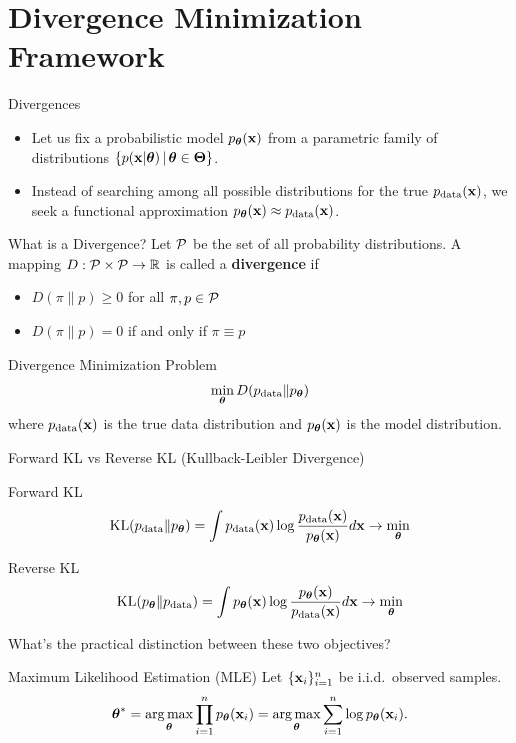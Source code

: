 \documentclass{beamer}
\renewcommand{\eqpause}{}
\begin{document}
\section{Divergence Minimization Framework}
\begin{frame}{Divergences}
	\begin{itemize}
	\item Let us fix a probabilistic model $p_{\boldsymbol{\theta}}(\mathbf{x})$ from a parametric family of distributions $\{p(\mathbf{x} | \boldsymbol{\theta}) \, | \, \boldsymbol{\theta} \in \boldsymbol{\Theta}\}$.\\
        \eqpause
	\item Instead of searching among all possible distributions for the true $p_{\text{data}}(\mathbf{x})$, we seek a functional approximation $p_{\boldsymbol{\theta}}(\mathbf{x}) \approx p_{\text{data}}(\mathbf{x})$.
	\end{itemize}
    \eqpause
	\begin{block}{What is a Divergence?}
		Let $\mathcal{P}$ be the set of all probability distributions. A mapping $D: \mathcal{P} \times \mathcal{P} \to \mathbb{R}$ is called a \textbf{divergence} if 
		\begin{itemize}
			\item $D(\pi \| p) \geq 0$ for all $\pi, p \in \mathcal{P}$
			\item $D(\pi \| p) = 0$ if and only if $\pi \equiv p$
		\end{itemize}
	\end{block}
    \eqpause
	\begin{block}{Divergence Minimization Problem}
		\vspace{-0.3cm}
		$$
		\min_{\boldsymbol{\theta}} D(p_{\text{data}} \| p_{\boldsymbol{\theta}})
		$$
		where $p_{\text{data}}(\mathbf{x})$ is the true data distribution and $p_{\boldsymbol{\theta}}(\mathbf{x})$ is the model distribution.
	\end{block}
\end{frame}
\begin{frame}{Forward KL vs Reverse KL (Kullback-Leibler Divergence)}
	\begin{block}{Forward KL}
		\vspace{-0.2cm}
		\[
			\mathrm{KL}(p_{\text{data}} \| p_{\boldsymbol{\theta}}) = \int p_{\text{data}}(\mathbf{x}) \log \frac{p_{\text{data}}(\mathbf{x})}{p_{\boldsymbol{\theta}}(\mathbf{x})} d \mathbf{x} \rightarrow \min_{\boldsymbol{\theta}}
		\]
	\end{block}
    \eqpause
	\begin{block}{Reverse KL}
		\vspace{-0.2cm}
		\[
			\mathrm{KL}(p_{\boldsymbol{\theta}} \| p_{\text{data}}) = \int p_{\boldsymbol{\theta}}(\mathbf{x}) \log \frac{p_{\boldsymbol{\theta}}(\mathbf{x})}{p_{\text{data}}(\mathbf{x})} d \mathbf{x} \rightarrow \min_{\boldsymbol{\theta}}
		\]
	\end{block}
    \eqpause
	What's the practical distinction between these two objectives?
    \eqpause
	\begin{block}{Maximum Likelihood Estimation (MLE)}
	Let $\{\mathbf{x}_i\}_{i=1}^n$ be i.i.d.\ observed samples.
		\vspace{-0.3cm}
		\[
			\boldsymbol{\theta}^* = \operatorname*{arg\,max}_{\boldsymbol{\theta}} \prod_{i=1}^n p_{\boldsymbol{\theta}}(\mathbf{x}_i) = \operatorname*{arg\,max}_{\boldsymbol{\theta}} \sum_{i=1}^n \log p_{\boldsymbol{\theta}}(\mathbf{x}_i).
		\]
	\end{block}
\end{frame}
\end{document}
